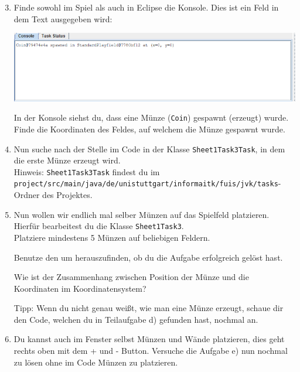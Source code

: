 \begin{enumerate}\setcounter{enumi}{2}

    \item Finde sowohl im Spiel als auch in Eclipse die Konsole. Dies ist ein Feld in dem Text ausgegeben wird:
    \begin{center}
        \includegraphics[width=\linewidth]{./figures/console.PNG}
    \end{center}

    In der Konsole siehst du, dass eine Münze (\texttt{Coin}) gespawnt (erzeugt) wurde.
    Finde die Koordinaten des Feldes, auf welchem die Münze gespawnt wurde.

    \item Nun suche nach der Stelle im Code in der Klasse \lstinline{Sheet1Task3Task}, in dem die erste Münze erzeugt wird.\\
    Hinweis: \lstinline{Sheet1Task3Task} findest du im \lstinline{project/src/main/java/de/unistuttgart/informaitk/fuis/jvk/tasks}-Ordner des Projektes.

    \item Nun wollen wir endlich mal selber Münzen auf das Spielfeld platzieren.
        Hierfür bearbeitest du die Klasse \lstinline{Sheet1Task3}.\\
        Platziere mindestens 5 Münzen auf beliebigen Feldern.

        Benutze den  um herauszufinden, ob du die Aufgabe erfolgreich gelöst hast.

        Wie ist der Zusammenhang zwischen Position der Münze und die Koordinaten im Koordinatensystem?

        Tipp: Wenn du nicht genau weißt, wie man eine Münze erzeugt, schaue dir den Code, welchen du in Teilaufgabe d) gefunden hast, nochmal an.
    \item Du kannst auch im Fenster selbst Münzen und Wände platzieren, dies geht rechts oben mit dem + und - Button. Versuche die Aufgabe e) nun nochmal zu lösen ohne im Code Münzen zu platzieren.
\end{enumerate}
